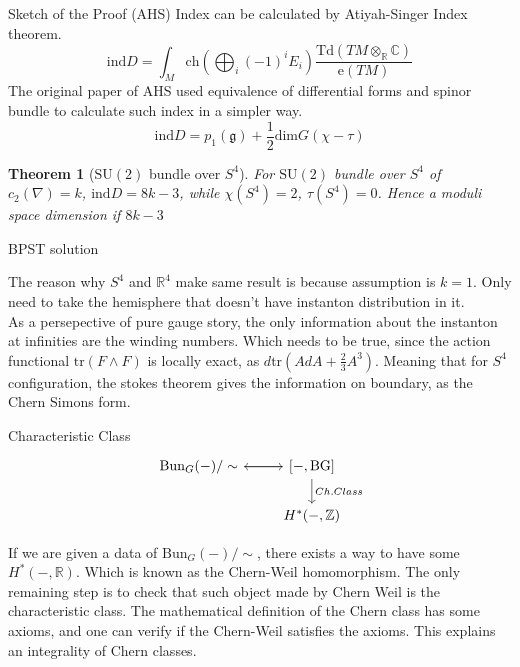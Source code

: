 \documentclass[10pt]{beamer}
\newtheorem{thm}{Theorem}
\begin{document}
\begin{frame}{Sketch of the Proof (AHS)}
    Index can be calculated by Atiyah-Singer Index theorem.
    \[
        \mathrm{ind}D = \int_M \mathrm{ch} \left( \bigoplus_i (-1)^i E_i \right) \frac{\mathrm{Td}(TM \otimes_\mathbb{R} \mathbb{C})}{\mathrm{e}(TM)}
    \]
    The original paper of AHS used equivalence of differential forms and spinor bundle to calculate such index in a simpler way.
    \[
        \mathrm{ind}D = p_1(\mathfrak{g})+\frac{1}{2}\mathrm{dim}G(\chi-\tau)
    \]

    \begin{thm}[$\mathrm{SU}(2)$ bundle over $S^4$]
        For $\mathrm{SU}(2)$ bundle over $S^4$ of $c_2(\nabla)=k$, $\mathrm{ind}D=8k-3$, while $\chi(S^4)=2$, $\tau(S^4)=0$. Hence a moduli space dimension if $8k-3$
    \end{thm}
\end{frame}
\begin{frame}{BPST solution}
  
    The reason why $S^4$ and $\mathbb{R}^4$ make same result is because assumption is $k=1$. Only need to take the hemisphere that doesn't have instanton distribution in it.
     \\
     As a persepective of pure gauge story, the only information about the instanton at infinities are the winding numbers. Which needs to be true, since the action functional $\mathrm{tr}(F\wedge F)$ is locally exact, as $d\mathrm{tr}(A dA + \frac{2}{3}A^3)$. Meaning that for $S^4$ configuration, the stokes theorem gives the information on boundary, as the Chern Simons form.
     \\
     
     
 \end{frame}

\begin{frame}[fragile]{Characteristic Class}
    \[
    \begin{tikzcd}
       \mathrm{Bun}_G(-)/\sim \arrow[r] 
        & {[-,\mathrm{BG}]}\arrow[l] \arrow[d, "Ch.Class"] \\
         & {H^*(-,\mathbb{Z})}
    \end{tikzcd}
    \]
    
    If we are given a data of $\mathrm{Bun}_G(-)/\sim$, there exists a way to have some $H^*(-,\mathbb{R})$. Which is known as the Chern-Weil homomorphism. The only remaining step is to check that such object made by Chern Weil is the characteristic class. The mathematical definition of the Chern class has some axioms, and one can verify if the Chern-Weil satisfies the axioms. This explains an integrality of Chern classes.
     
 \end{frame}
\end{document}
